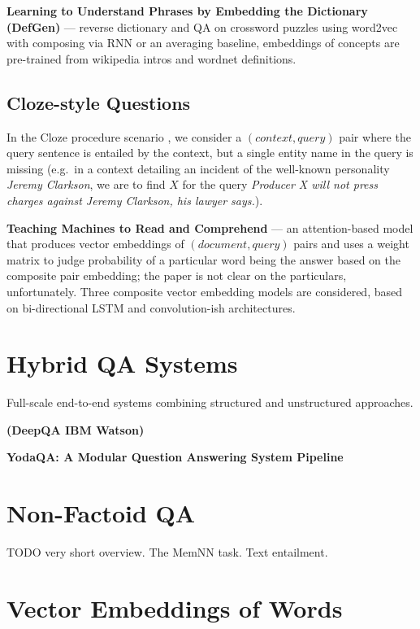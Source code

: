 \textbf{Learning to Understand Phrases by Embedding the Dictionary (DefGen)} \cite{DefGen}
	--- reverse dictionary and QA on crossword puzzles using word2vec
	with composing via RNN or an averaging baseline, embeddings of
	concepts are pre-trained from wikipedia intros and wordnet definitions.

\subsection{Cloze-style Questions}

In the Cloze procedure scenario \cite{Cloze},
we consider a $(context, query)$ pair where the query
sentence is entailed by the context, but a single entity name in the query
is missing (e.g.\ in a context detailing an incident of the well-known personality
\textit{Jeremy Clarkson}, we are to find $X$ for the query
\textit{Producer X will not press charges against Jeremy Clarkson, his lawyer says.}).

\textbf{Teaching Machines to Read and Comprehend} \cite{ReadAndComprehend}
	--- an attention-based model that produces vector embeddings of $(document, query)$
	pairs and uses a weight matrix to judge probability of a particular
	word being the answer based on the composite pair embedding;
	the paper is not clear on the particulars, unfortunately.
	Three composite vector embedding models are considered,
	based on bi-directional LSTM and convolution-ish architectures.

\section{Hybrid QA Systems}

Full-scale end-to-end systems combining structured and unstructured approaches.

\textbf{(DeepQA IBM Watson)} \cite{WatsonOverview}

\textbf{YodaQA: A Modular Question Answering System Pipeline} \cite{YodaQAPoster2015}

\section{Non-Factoid QA}

TODO very short overview.  The MemNN task.  Text entailment.

\section{Vector Embeddings of Words}


